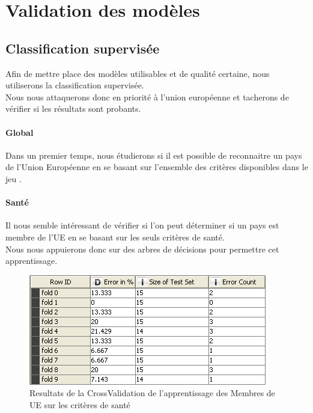 \section{Validation des modèles}


\subsection{Classification supervisée}
Afin de mettre place des modèles utilisables et de qualité certaine, nous utiliserons la classification supervisée.\\
Nous nous attaquerons donc en priorité à l'union européenne et tacherons de vérifier si les résultats sont probants.

\paragraph{Global}
Dans un premier temps, nous étudierons si il est possible de reconnaitre un pays de l'Union Européenne en se basant sur l'ensemble des critères disponibles dans le jeu \jeuc .

\paragraph{Santé}
Il nous semble intéressant de vérifier si l'on peut déterminer si un pays est membre de l'UE en se basant sur les seuls critères de santé.\\
Nous nous appuierons donc sur des arbres de décisions pour permettre cet apprentissage.
\begin{figure}[H]
	\begin{center}
		\includegraphics[scale=0.5]{Image/ErrorRatesSante}
		\caption{Resultats de la CrossValidation de l'apprentissage des Membres de UE sur les critères de santé}
	\end{center}
\end{figure}


